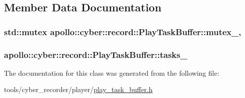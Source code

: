 \subsection{Member Data Documentation}
\hypertarget{classapollo_1_1cyber_1_1record_1_1PlayTaskBuffer_a1ffbe36785389d7f80ee266898ab1348}{
\subsubsection[{mutex\-\_\-}]{\setlength{\rightskip}{0pt plus 5cm}std\-::mutex apollo\-::cyber\-::record\-::\-Play\-Task\-Buffer\-::mutex\-\_\-\hspace{0.3cm}{\ttfamily [mutable]}, {\ttfamily [private]}}}\label{classapollo_1_1cyber_1_1record_1_1PlayTaskBuffer_a1ffbe36785389d7f80ee266898ab1348}
\hypertarget{classapollo_1_1cyber_1_1record_1_1PlayTaskBuffer_a4d96a5bc32297ceb367780f555d323d8}{
\subsubsection[{tasks\-\_\-}]{ apollo\-::cyber\-::record\-::\-Play\-Task\-Buffer\-::tasks\-\_\-\hspace{0.3cm}{\ttfamily [private]}}}\label{classapollo_1_1cyber_1_1record_1_1PlayTaskBuffer_a4d96a5bc32297ceb367780f555d323d8}


The documentation for this class was generated from the following file\-:\begin{DoxyCompactItemize}
\item 
tools/cyber\-\_\-recorder/player/\hyperlink{play__task__buffer_8h}{play\-\_\-task\-\_\-buffer.\-h}\end{DoxyCompactItemize}
